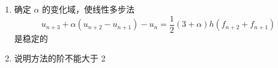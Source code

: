 


\label{prob:<NMSDE>:<chap1>:<Page 29 - 第3节 - T2>}

\begin{enumerate}

    \item 确定 $\alpha$ 的变化域，使线性多步法
    \[
        u_{n + 3} + \alpha(u_{n + 2} - u_{n + 1}) - u_{n}
        =
        \frac{1}{2}(3 + \alpha)h(f_{n + 2} + f_{n + 1})
    \]
    是稳定的

    \begin{tcolorbox}


    \end{tcolorbox}

    \clearpage
    \newpage

    \item 说明方法的阶不能大于 2

    \begin{tcolorbox}


    \end{tcolorbox}

\end{enumerate}
